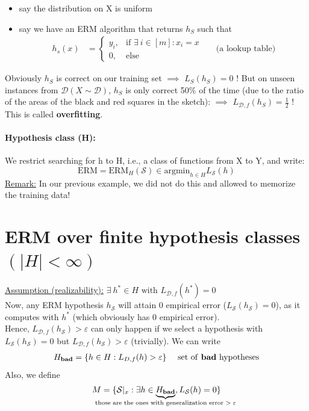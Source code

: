 \documentclass[10pt,a4paper]{article}
\theoremstyle{definition}
\theoremstyle{plain}
\begin{document}
\begin{itemize}
	\item say the distribution on X is uniform
	\item say we have an ERM algorithm that returns $h_S$ such that 
	\begin{align*}
			 h_s(x) &= \begin{cases}
			y_i , &  \text{if } \exists \ i \in [m]: x_i = x  \\
			0 , &  \text{else} 
		\end{cases} && \text{(a lookup table)} 
	\end{align*}
\end{itemize}
Obviously $h_S$ is correct on our training set $\implies$ \colorbox{Apricot}{$L_S(h_S) = 0 \text{ !}$}
But on unseen instances from $\mathcal{D} (X \sim \mathcal{D})$, $h_S$ is only correct 50\% of the time (due to the ratio of the areas of the black and red squares in the sketch): $\implies $ \colorbox{Apricot}{$L_{\mathcal{D},f}(h_S) = \frac{1}{2} \text{ !}$}
This is called \textbf{overfitting}.

\paragraph{Hypothesis class (H):} We restrict searching for h to H, i.e., a class of functions from X to Y, and write:
$$
\text{ERM} = \text{ERM}_{H} (\mathcal{S}) \in \text{argmin}_{h \in H} L_{\mathcal{S}}(h)
$$
\underline{Remark:} In our previous example, we did not do this and allowed to memorize the training data!

\section*{ERM over finite hypothesis classes $(\big|H\big| < \infty)$}
\underline{Assumption (realizability):} $ \exists \ h^*\in H \text{ with } L_{\mathcal{D},f}(h^*) = 0$\\
Now, any ERM hypothesis $h_\mathcal{S}$ will attain 0 empirical error ($L_\mathcal{S}(h_\mathcal{S}) = 0$), as it computes with $h^*$ (which obviously has 0 empirical error).\\
\newline
Hence, $L_{\mathcal{D},f}(h_\mathcal{S}) > \varepsilon$ can only happen if we select a hypothesis with $L_\mathcal{S}(h_\mathcal{S}) = 0$ but $L_{\mathcal{D},f}(h_\mathcal{S}) > \varepsilon$ (trivially). We can write
\begin{align*}
	H_\text{\textbf{bad}} &= \{h \in H: L_{D,f}(h)>\varepsilon\} && \text{ set of \textbf{bad} hypotheses}\\
\end{align*}
Also, we define
\begin{align*}
	M &= \{\mathcal{S}|_x : \exists h \in \underbrace{H_{\mathrm{\textbf{bad}}}}_{
		\mathclap{  \text{ those are the ones with generalization error $> \varepsilon$ } }
		}, L_\mathcal{S}(h) = 0  \}\\
\end{align*}
\end{document}
